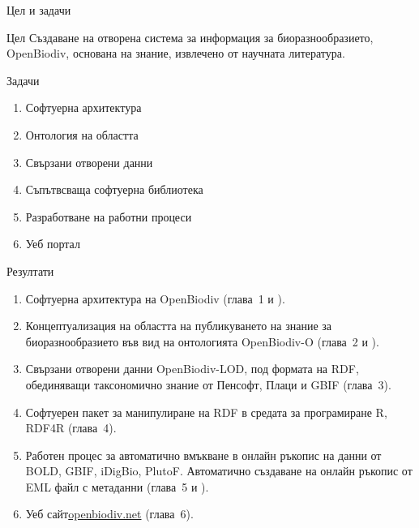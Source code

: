 \documentclass[bulgarian]{beamer}
\begin{document}
\begin{frame}{Цел и задачи}

\begin{alertblock}{Цел}
Създаване на отворена система за информация за биоразнообразието, OpenBiodiv, основана на знание, извлечено от научната литература.
\end{alertblock}

\begin{block}{Задачи}
\begin{enumerate}

\item{Софтуерна архитектура} 

\item{Онтология на областта}

\item{Свързани отворени данни}

\item{Съпътвсваща софтуерна библиотека}

\item{Разработване на работни процеси}

\item{Уеб портал} 

\end{enumerate}
\end{block}
\end{frame}

\begin{frame}{Резултати}

\begin{enumerate}
    \item Софтуерна архитектура на OpenBiodiv (глава~1 и \cite{senderov_open_2016}).
    \item Концептуализация на областта на публикуването на знание за биоразнообразието във вид на онтологията OpenBiodiv-O (глава~2 и \cite{senderov_openbiodiv-o:_2018}). 
    \item Свързани отворени данни OpenBiodiv-LOD, под формата на RDF, обединяващи таксономично знание от Пенсофт, Плаци и GBIF (глава~3).
    \item Софтуерен пакет за манипулиране на RDF в средата за програмиране R, RDF4R (глава~4).
    \item Работен процес за автоматично вмъкване в онлайн ръкопис на данни от BOLD, GBIF, iDigBio, PlutoF. Автоматично създаване на онлайн ръкопис от EML файл с метаданни (глава~5 и \cite{senderov_online_2016}).
    \item Уеб сайт\href{http://openbiodiv.net}{openbiodiv.net} (глава~6).

\end{enumerate}

\end{frame}
\end{document}
